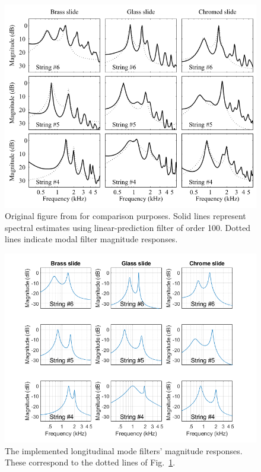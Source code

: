 \documentclass[../main.tex]{subfiles}
\begin{document}
\begin{figure}[h]
        \centering
        \includegraphics[scale=.65]{./images/plots/LongitudinalModeFiltersOriginal.png}
        \caption{Original figure from  for comparison purposes. Solid lines represent spectral estimates using linear-prediction filter of order 100. Dotted lines indicate modal filter magnitude responses.}
        \label{fig:LongModeOrig}
\end{figure}

\begin{figure}[h]
        \centering
        \includegraphics[scale=.65]{./images/plots/LongitudinalModeFiltersRecreation.png}
        \caption{The implemented longitudinal mode filters' magnitude responses. These correspond to the dotted lines of Fig.~\ref{fig:LongModeOrig}.}
        \label{fig:LongModeRecr}
\end{figure}
\end{document}
